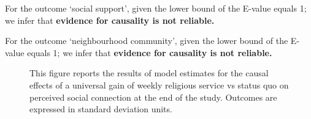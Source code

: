 \documentclass[
  singlecolumn]{article}
\begin{document}
For the outcome `social support', given the lower bound of the E-value
equals 1; we infer that \textbf{evidence for causality is not reliable.}

For the outcome `neighbourhood community', given the lower bound of the
E-value equals 1; we infer that \textbf{evidence for causality is not
reliable.}

\newpage{}

\begin{figure}


\caption{\label{fig-2_2}This figure reports the results of model
estimates for the causal effects of a universal gain of weekly religious
service vs status quo on perceived social connection at the end of the
study. Outcomes are expressed in standard deviation units.}

\end{figure}%
\end{document}
